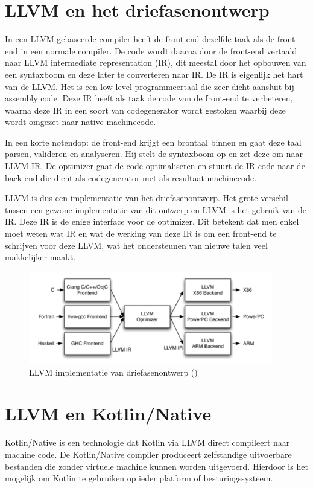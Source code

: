 \section{LLVM en het driefasenontwerp}
\label{sec:difference-llvm}
In een LLVM-gebaseerde compiler heeft de front-end dezelfde taak als de front-end in een normale compiler. De code wordt daarna door de front-end vertaald naar LLVM intermediate representation (IR), dit meestal door het opbouwen van een syntaxboom en deze later te converteren naar IR. De IR is eigenlijk het hart van de LLVM. Het is een low-level programmeertaal die zeer dicht aansluit bij assembly code. Deze IR heeft als taak de code van de front-end te verbeteren, waarna deze IR in een soort van codegenerator wordt gestoken waarbij deze wordt omgezet naar native machinecode. 

In een korte notendop: de front-end krijgt een brontaal binnen en gaat deze taal parsen, valideren en analyseren. Hij stelt de syntaxboom op en zet deze om naar LLVM IR. De optimizer gaat de code optimaliseren en stuurt de IR code naar de back-end die dient als codegenerator met als resultaat machinecode.

LLVM is dus een implementatie van het driefasenontwerp. Het grote verschil tussen een gewone implementatie van dit ontwerp en LLVM is het gebruik van de IR. Deze IR is de enige interface voor de optimizer. Dit betekent dat men enkel moet weten wat IR en wat de werking van deze IR is om een front-end te schrijven voor deze LLVM, wat het ondersteunen van nieuwe talen veel makkelijker maakt.

\begin{figure} [ht]
	\centering
	\includegraphics[width=0.95\textwidth]{img/llvmirdriefasen}
	\caption{LLVM implementatie van driefasenontwerp (\cite{aosa})}
	\label{fig:llvmirdriefasen}
\end{figure}

\section{LLVM en Kotlin/Native}
Kotlin/Native is een technologie dat Kotlin via LLVM direct compileert naar machine code. De Kotlin/Native compiler produceert zelfstandige uitvoerbare bestanden die zonder virtuele machine kunnen worden uitgevoerd. Hierdoor is het mogelijk om Kotlin te gebruiken op ieder platform of besturingssysteem.

